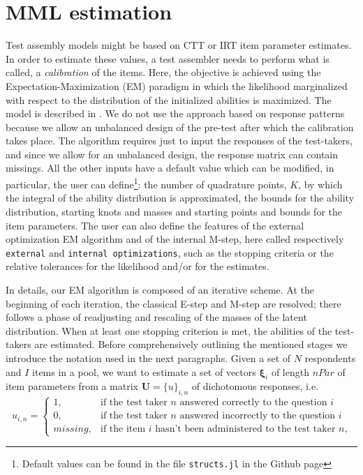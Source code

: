 \section{MML estimation}\label{sec:estimation}

Test assembly models might be based on CTT or IRT item parameter estimates. In order to estimate these values, a test assembler needs to perform what is called, a \emph{calibration} of the items. Here, the objective is achieved using the Expectation-Maximization (EM) paradigm in which the likelihood marginalized with respect to the distribution of the initialized abilities is maximized. The model is described in \textcite{bock1981marginal}. We do not use the approach based on response patterns because we allow an unbalanced design of the pre-test after which the calibration takes place. The algorithm requires just to input the responses of the test-takers, and since we allow for an unbalanced design, the response matrix can contain missings. All the other inputs have a default value which can be  modified, in particular, the user can define\footnote{Default values can be found in the file \texttt{structs.jl} in the Github page}: the number of quadrature points, $K$, by which the integral of the ability distribution is approximated, the bounds for the ability distribution, starting knots and masses and starting points and bounds for the item parameters. The user can also define the features of the external optimization EM algorithm and of the internal M-step, here called respectively \texttt{external} and \texttt{internal optimizations}, such as the stopping criteria or the relative tolerances for the likelihood and/or for the estimates. 

In details, our EM algorithm is composed of an iterative scheme. At the beginning of each iteration, the classical E-step and M-step are resolved; there follows a phase of readjusting and rescaling of the masses of the latent distribution. When at least one stopping criterion is met, the abilities of the test-takers are estimated. Before comprehensively outlining the mentioned stages we introduce the notation used in the next paragraphs.
Given a set of $N$ respondents and $I$ items in a pool, we want to estimate a set of vectors $\boldsymbol{\xi}_i$ of length $nPar$ of item parameters from a matrix $\mathbf{U}=\{u\}_{i,n}$ of dichotomous responses, i.e.
\begin{equation*}
u_{i,n}= 
\begin{cases} 
1, & \mbox{if the test taker $n$ answered correctly to the question $i$}  \\
0, & \mbox{if the test taker $n$ answered incorrectly to the question $i$}\\
missing, & \mbox{if the item $i$ hasn't been administered to the test taker $n$,}
\end{cases}
\end{equation*}


